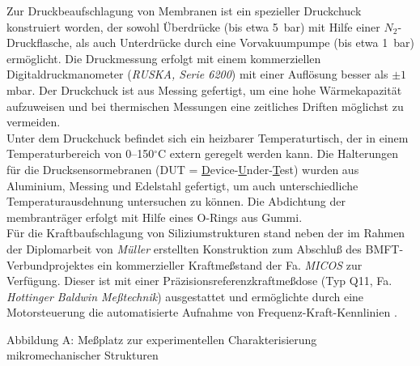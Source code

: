 Zur Druckbeaufschlagung von Membranen ist ein spezieller Druckchuck
konstruiert worden, der sowohl Überdrücke (bis etwa 5~bar) mit Hilfe einer
$N_{2}$-Druckflasche, als auch Unterdrücke durch eine Vorvakuumpumpe
(bis etwa 1~bar) ermöglicht. Die Druckmessung erfolgt mit einem
kommerziellen Digitaldruckmanometer ({\em RUSKA, Serie 6200}) mit einer
Auflösung besser als $\pm1$ mbar. Der Druckchuck ist aus Messing gefertigt,
um eine hohe Wärmekapazität aufzuweisen und bei thermischen Messungen
eine zeitliches Driften möglichst zu vermeiden. \\

Unter dem Druckchuck befindet sich ein heizbarer Temperaturtisch, der in
einem Temperaturbereich von 0--150$^\circ$C extern geregelt werden kann.
Die Halterungen für die Drucksensormebranen
(DUT = \underline{D}evice-\underline{U}nder-\underline{T}est)
wurden aus Aluminium, Messing und Edelstahl gefertigt, um auch
unterschiedliche Temperaturausdehnung untersuchen zu können. Die
Abdichtung der membranträger erfolgt mit Hilfe eines O-Rings aus Gummi.\\
%
Für die Kraftbaufschlagung von Siliziumstrukturen stand neben der
im Rahmen der Diplomarbeit von {\sl Müller} erstellten Konstruktion
\cite{Mue92} zum Abschluß des BMFT-Verbundprojektes ein kommerzieller
Kraftmeßstand der Fa. {\em MICOS} zur Verfügung. Dieser ist mit einer
Präzisionsreferenzkraftmeßdose (Typ Q11, Fa. {\em Hottinger Baldwin
Meßtechnik}) ausgestattet und ermöglichte durch eine Motorsteuerung die
automatisierte Aufnahme von Frequenz-Kraft-Kennlinien \cite{Wag94}.


\newpage

Abbildung A: Meßplatz zur experimentellen Charakterisierung
mikromechanischer Strukturen\\

